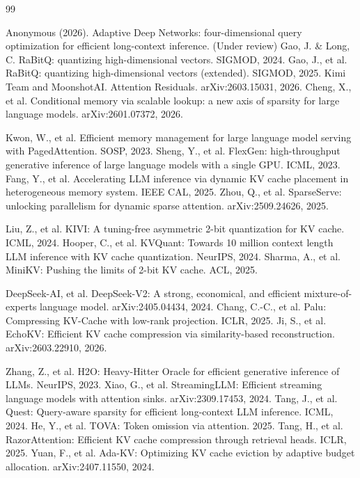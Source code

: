 \documentclass[11pt,a4paper]{article}
\theoremstyle{plain}
\theoremstyle{definition}
\begin{document}

\begin{thebibliography}{99}

 Anonymous (2026). Adaptive Deep Networks: four-dimensional query optimization for efficient long-context inference. (Under review)
 Gao, J. \& Long, C. RaBitQ: quantizing high-dimensional vectors. SIGMOD, 2024.
 Gao, J., et al. RaBitQ: quantizing high-dimensional vectors (extended). SIGMOD, 2025.
 Kimi Team and MoonshotAI. Attention Residuals. arXiv:2603.15031, 2026.
 Cheng, X., et al. Conditional memory via scalable lookup: a new axis of sparsity for large language models. arXiv:2601.07372, 2026.

 Kwon, W., et al. Efficient memory management for large language model serving with PagedAttention. SOSP, 2023.
 Sheng, Y., et al. FlexGen: high-throughput generative inference of large language models with a single GPU. ICML, 2023.
 Fang, Y., et al. Accelerating LLM inference via dynamic KV cache placement in heterogeneous memory system. IEEE CAL, 2025.
 Zhou, Q., et al. SparseServe: unlocking parallelism for dynamic sparse attention. arXiv:2509.24626, 2025.

 Liu, Z., et al. KIVI: A tuning-free asymmetric 2-bit quantization for KV cache. ICML, 2024.
 Hooper, C., et al. KVQuant: Towards 10 million context length LLM inference with KV cache quantization. NeurIPS, 2024.
 Sharma, A., et al. MiniKV: Pushing the limits of 2-bit KV cache. ACL, 2025.

 DeepSeek-AI, et al. DeepSeek-V2: A strong, economical, and efficient mixture-of-experts language model. arXiv:2405.04434, 2024.
 Chang, C.-C., et al. Palu: Compressing KV-Cache with low-rank projection. ICLR, 2025.
 Ji, S., et al. EchoKV: Efficient KV cache compression via similarity-based reconstruction. arXiv:2603.22910, 2026.

 Zhang, Z., et al. H2O: Heavy-Hitter Oracle for efficient generative inference of LLMs. NeurIPS, 2023.
 Xiao, G., et al. StreamingLLM: Efficient streaming language models with attention sinks. arXiv:2309.17453, 2024.
 Tang, J., et al. Quest: Query-aware sparsity for efficient long-context LLM inference. ICML, 2024.
 He, Y., et al. TOVA: Token omission via attention. 2025.
 Tang, H., et al. RazorAttention: Efficient KV cache compression through retrieval heads. ICLR, 2025.
 Yuan, F., et al. Ada-KV: Optimizing KV cache eviction by adaptive budget allocation. arXiv:2407.11550, 2024.


\end{thebibliography}
\end{document}
